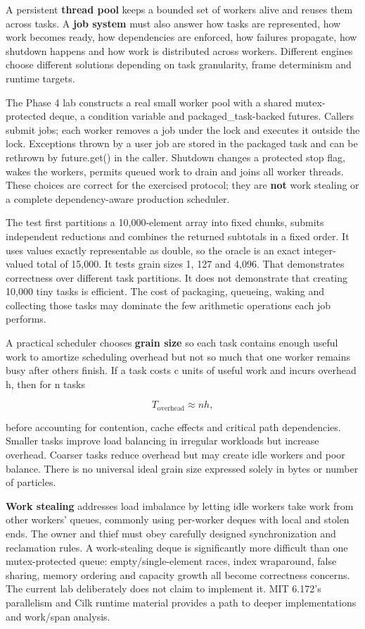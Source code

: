 A persistent \textbf{thread pool} keeps a bounded set of workers alive and reuses them across tasks. A \textbf{job system} must also answer how tasks are represented, how work becomes ready, how dependencies are enforced, how failures propagate, how shutdown happens and how work is distributed across workers. Different engines choose different solutions depending on task granularity, frame determinism and runtime targets.

The Phase 4 lab constructs a real small worker pool with a shared mutex-protected deque, a condition variable and packaged\_task-backed futures. Callers submit jobs; each worker removes a job under the lock and executes it outside the lock. Exceptions thrown by a user job are stored in the packaged task and can be rethrown by future.get() in the caller. Shutdown changes a protected stop flag, wakes the workers, permits queued work to drain and joins all worker threads. These choices are correct for the exercised protocol; they are \textbf{not} work stealing or a complete dependency-aware production scheduler.

The test first partitions a 10,000-element array into fixed chunks, submits independent reductions and combines the returned subtotals in a fixed order. It uses values exactly representable as double, so the oracle is an exact integer-valued total of 15,000. It tests grain sizes 1, 127 and 4,096. That demonstrates correctness over different task partitions. It does not demonstrate that creating 10,000 tiny tasks is efficient. The cost of packaging, queueing, waking and collecting those tasks may dominate the few arithmetic operations each job performs.

A practical scheduler chooses \textbf{grain size} so each task contains enough useful work to amortize scheduling overhead but not so much that one worker remains busy after others finish. If a task costs c units of useful work and incurs overhead h, then for n tasks

\[
T_{\mathrm{overhead}}\approx n h,
\]

before accounting for contention, cache effects and critical path dependencies. Smaller tasks improve load balancing in irregular workloads but increase overhead. Coarser tasks reduce overhead but may create idle workers and poor balance. There is no universal ideal grain size expressed solely in bytes or number of particles.

\textbf{Work stealing} addresses load imbalance by letting idle workers take work from other workers' queues, commonly using per-worker deques with local and stolen ends. The owner and thief must obey carefully designed synchronization and reclamation rules. A work-stealing deque is significantly more difficult than one mutex-protected queue: empty/single-element races, index wraparound, false sharing, memory ordering and capacity growth all become correctness concerns. The current lab deliberately does not claim to implement it. MIT 6.172's parallelism and Cilk runtime material provides a path to deeper implementations and work/span analysis.

